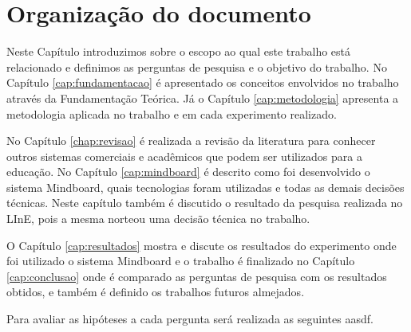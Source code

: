 \section{Organização do documento}

Neste Capítulo introduzimos sobre o escopo ao qual este trabalho está relacionado e definimos as perguntas de pesquisa e o objetivo do trabalho. No Capítulo \ref{cap:fundamentacao} é apresentado os conceitos envolvidos no trabalho através da Fundamentação Teórica. Já o Capítulo \ref{cap:metodologia} apresenta a metodologia aplicada no trabalho e em cada experimento realizado. 

No Capítulo \ref{chap:revisao} é realizada a revisão da literatura para conhecer outros sistemas comerciais e acadêmicos que podem ser utilizados para a educação. No Capítulo \ref{cap:mindboard} é descrito como foi desenvolvido o sistema Mindboard, quais tecnologias foram utilizadas e todas as demais decisões técnicas. Neste capítulo também é discutido o resultado da pesquisa realizada no LInE, pois a mesma norteou uma decisão técnica no trabalho.

O Capítulo \ref{cap:resultados} mostra e discute os resultados do experimento onde foi utilizado o sistema Mindboard e o trabalho é finalizado no Capítulo \ref{cap:conclusao} onde é comparado as perguntas de pesquisa com os resultados obtidos, e também é definido os trabalhos futuros almejados.

\iffalse

Para avaliar as hipóteses a cada pergunta será realizada as seguintes aasdf.






